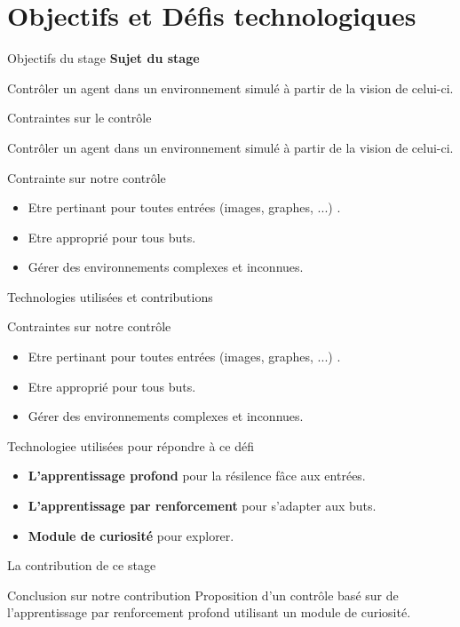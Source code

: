 \section{Objectifs et Défis technologiques}
\begin{frame}{Objectifs du stage}
\textbf{Sujet du stage}

Contrôler un agent dans un environnement simulé à partir de la vision de celui-ci.
\end{frame}

\begin{frame}{Contraintes sur le contrôle}

Contrôler un agent dans un environnement simulé à partir de la vision de celui-ci.

\begin{alertblock}{Contrainte sur notre contrôle}
    \begin{itemize}
        \item Etre pertinant pour toutes entrées (images, graphes, ...) .
        \item Etre approprié pour tous buts.
        \item Gérer des environnements complexes et inconnues.
    \end{itemize}
\end{alertblock}

\end{frame}

\begin{frame}{Technologies utilisées et contributions}
    \begin{alertblock}{Contraintes sur notre contrôle}
    \begin{itemize}
        \item Etre pertinant pour toutes entrées (images, graphes, ...) .
        \item Etre approprié pour tous buts.
        \item Gérer des environnements complexes et inconnues.
    \end{itemize}
\end{alertblock}

\begin{exampleblock}{Technologiee utilisées pour répondre à ce défi}
    \begin{itemize}
        \item \textbf{L'apprentissage profond} pour la résilence fâce aux entrées.
        \item \textbf{L'apprentissage par renforcement} pour s'adapter aux buts.
        \item \textbf{Module de curiosité} pour explorer.
    \end{itemize}
\end{exampleblock}
\end{frame}

\begin{frame}{La contribution de ce stage}
\begin{block}{Conclusion sur notre contribution}
    Proposition d'un contrôle  basé sur de l'apprentissage par renforcement profond utilisant un module de curiosité.
\end{block}


\end{frame}

